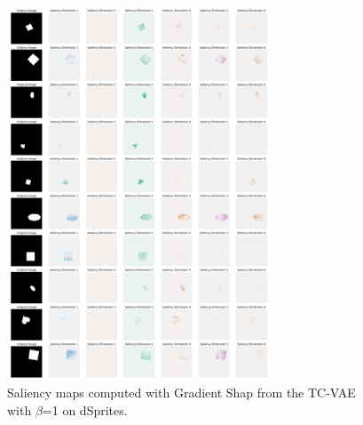 \begin{figure}[h]
\centering
    \includegraphics[width=0.7\textwidth]{images/vae/tc_vae_1_sms_dsprites.PNG}
\caption{Saliency maps computed with Gradient Shap from the TC-VAE with  $\beta$=1 on dSprites.}\label{fig:tcvae1smsdsprites}
\end{figure}

